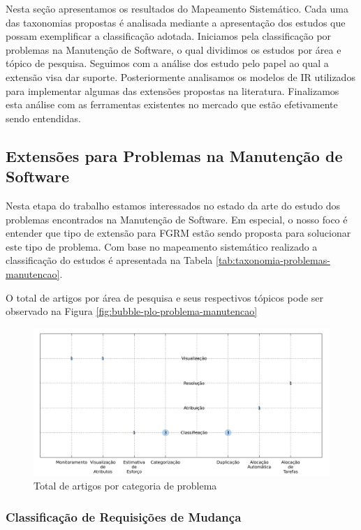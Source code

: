 \documentclass[msc]{ppgccufmg} %
\begin{document}
Nesta seção apresentamos os resultados do Mapeamento Sistemático. Cada uma das taxonomias propostas
é analisada mediante a apresentação dos estudos que possam exemplificar a classificação adotada.
Iniciamos pela classificação por problemas na Manutenção de Software, o qual dividimos os estudos
por área e tópico de pesquisa. Seguimos com a análise dos estudo pelo papel ao qual a extensão visa
dar suporte. Posteriormente analisamos os modelos de IR utilizados para implementar algumas das
extensões propostas na literatura. Finalizamos esta análise com as ferramentas existentes no mercado
que estão efetivamente sendo entendidas.

\subsection{Extensões para Problemas na Manutenção de Software}
\label{sub:extensões_para_problemas_na_manutenção_de_software}

Nesta etapa do trabalho estamos interessados no estado da arte do estudo dos problemas encontrados
na Manutenção de Software. Em especial, o nosso foco é entender que tipo de extensão para FGRM estão
sendo proposta para solucionar este tipo de problema. Com base no mapeamento sistemático realizado a
classificação do estudos é apresentada na Tabela \ref{tab:taxonomia-problemas-manutencao}.


O total de artigos por área de pesquisa e seus respectivos tópicos pode ser observado na Figura
\ref{fig:bubble-plo-problema-manutencao}



\begin{figure}[htpb]
	\centering
	\includegraphics[width=0.8\linewidth]{../img/bubble-plot-problema-manutencao.pdf}
	\caption{Total de artigos por categoria de problema}
	\label{fig:bubble-plot-problema-manutencao}
\end{figure}
\subsubsection{Classificação de Requisições de Mudança}
\label{ssub:classificação_de_requisições_de_mudança}
\end{document}
